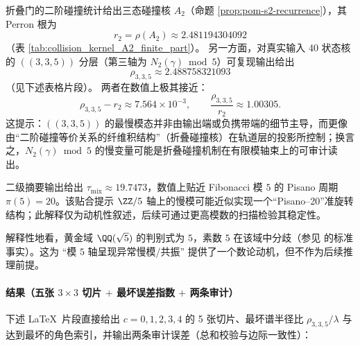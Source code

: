 \begin{remark}[慢模与折叠碰撞核的同源性信号]\label{rem:arity-335-rho-close-to-a2}
折叠门的二阶碰撞统计给出三态碰撞核 \(A_2\)（命题 \ref{prop:pom-s2-recurrence}），其 Perron 根为
$$
r_2=\rho(A_2)\approx 2.481194304092
$$
（表 \ref{tab:collision_kernel_A2_finite_part}）。
另一方面，对真实输入 40 状态核的 \(((3,3,5))\) 分层（第三轴为 \(N_2(\gamma)\bmod 5\)）可复现输出给出
$$
\rho_{3,3,5}\approx 2.488758321093
$$
（见下述表格片段）。
两者在数值上极其接近：
$$
\rho_{3,3,5}-r_2\approx 7.564\times 10^{-3},
\qquad
\frac{\rho_{3,3,5}}{r_2}\approx 1.00305.
$$
这提示：\(((3,3,5))\) 的最慢模态并非由输出端或负携带端的细节主导，而更像由“二阶碰撞等价关系的纤维积结构”（折叠碰撞核）在轨道层的投影所控制；换言之，\(N_2(\gamma)\bmod 5\) 的慢变量可能是折叠碰撞机制在有限模轴束上的可审计读出。
\end{remark}

\begin{remark}\label{rem:arity-335-pisano}
二级摘要输出给出
\(
\tau_{\mathrm{mix}}\approx 19.7473
\)，数值上贴近 Fibonacci 模 $5$ 的 Pisano 周期 $\pi(5)=20$。该贴合提示 $\ZZ/5$ 轴上的慢模可能近似实现一个“Pisano--20”准旋转结构；此解释仅为动机性叙述，后续可通过更高模数的扫描检验其稳定性。
\end{remark}

\begin{remark}[分歧素数的动机性解释]\label{rem:arity-335-ramification}
解释性地看，黄金域 $\QQ(\sqrt5)$ 的判别式为 $5$，素数 $5$ 在该域中分歧（参见 \cite{Apostol1976} 的标准事实）。这为 “模 $5$ 轴呈现异常慢模/共振” 提供了一个数论动机，但不作为后续推理前提。
\end{remark}

\paragraph{结果（五张 \texorpdfstring{$3\times 3$}{3x3} 切片 \texorpdfstring{$+$}{+} 最坏误差指数 \texorpdfstring{$+$}{+} 两条审计）}
下述 \LaTeX\ 片段直接给出 $c=0,1,2,3,4$ 的 5 张切片、最坏谱半径比 $\rho_{3,3,5}/\lambda$ 与达到最坏的角色索引，并输出两条审计误差（总和校验与边际一致性）：
